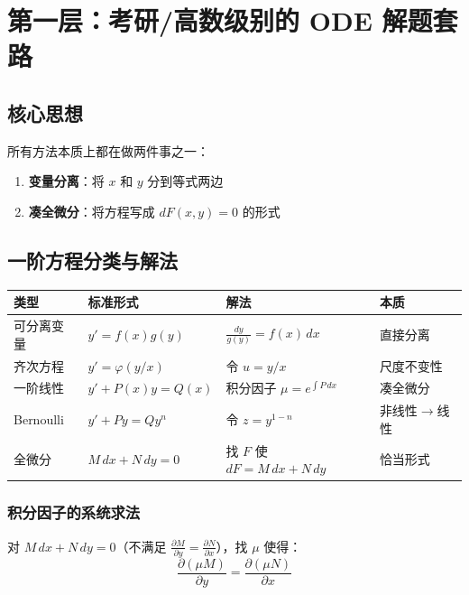 \section{第一层：考研/高数级别的 ODE 解题套路}

\subsection{核心思想}

所有方法本质上都在做两件事之一：
\begin{enumerate}
  \item \textbf{变量分离}：将 $x$ 和 $y$ 分到等式两边
  \item \textbf{凑全微分}：将方程写成 $dF(x,y) = 0$ 的形式
\end{enumerate}

\subsection{一阶方程分类与解法}

\begin{center}
\begin{tabular}{p{2.5cm}p{4cm}p{4cm}p{3cm}}
\toprule
\textbf{类型} & \textbf{标准形式} & \textbf{解法} & \textbf{本质} \\
\midrule
可分离变量 & $y' = f(x)g(y)$ & $\frac{dy}{g(y)} = f(x)\,dx$ & 直接分离 \\
齐次方程 & $y' = \varphi(y/x)$ & 令 $u = y/x$ & 尺度不变性 \\
一阶线性 & $y' + P(x)y = Q(x)$ & 积分因子 $\mu = e^{\int P\,dx}$ & 凑全微分 \\
Bernoulli & $y' + Py = Qy^n$ & 令 $z = y^{1-n}$ & 非线性$\to$线性 \\
全微分 & $M\,dx + N\,dy = 0$ & 找 $F$ 使 $dF = M\,dx + N\,dy$ & 恰当形式 \\
\bottomrule
\end{tabular}
\end{center}

\subsubsection{积分因子的系统求法}

对 $M\,dx + N\,dy = 0$（不满足 $\frac{\partial M}{\partial y} = \frac{\partial N}{\partial x}$），找 $\mu$ 使得：
\[
\frac{\partial(\mu M)}{\partial y} = \frac{\partial(\mu N)}{\partial x}
\]

